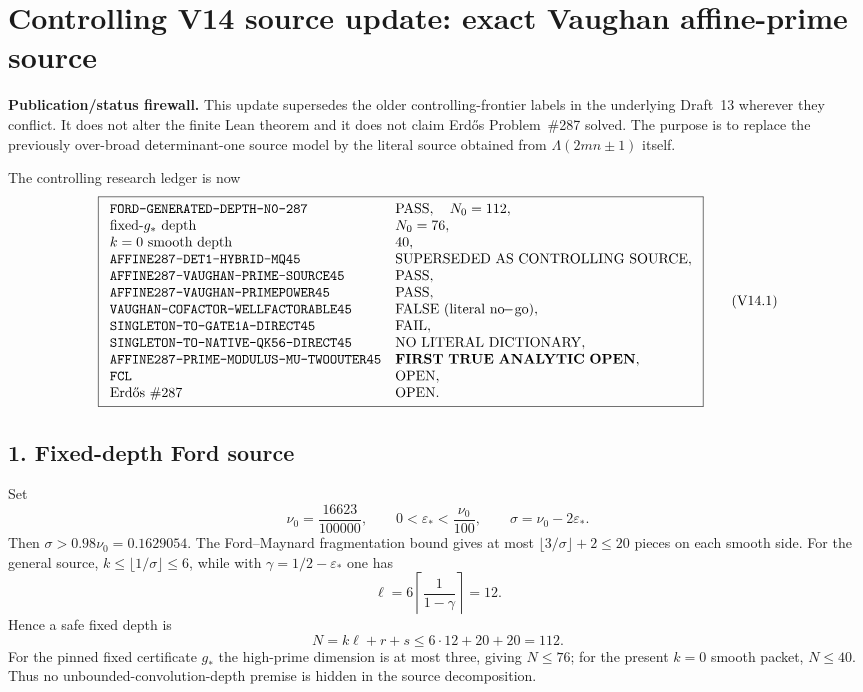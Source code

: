 \clearpage
\section*{Controlling V14 source update: exact Vaughan affine-prime source}

\noindent\textbf{Publication/status firewall.}
This update supersedes the older controlling-frontier labels in the underlying Draft~13 wherever they conflict.
It does not alter the finite Lean theorem and it does not claim Erd\H{o}s Problem~\#287 solved.  The purpose is to
replace the previously over-broad determinant-one source model by the literal source obtained from
$\Lambda(2mn\pm1)$ itself.

\medskip
\noindent The controlling research ledger is now
\[
\boxed{\begin{array}{ll}
\texttt{FORD-GENERATED-DEPTH-N0-287} & \mathrm{PASS},\quad N_0=112,\\
\text{fixed-}g_*\text{ depth} & N_0=76,\\
\text{$k=0$ smooth depth} & 40,\\
\texttt{AFFINE287-DET1-HYBRID-MQ45} & \mathrm{SUPERSEDED\ AS\ CONTROLLING\ SOURCE},\\
\texttt{AFFINE287-VAUGHAN-PRIME-SOURCE45} & \mathrm{PASS},\\
\texttt{AFFINE287-VAUGHAN-PRIMEPOWER45} & \mathrm{PASS},\\
\texttt{VAUGHAN-COFACTOR-WELLFACTORABLE45} & \mathrm{FALSE\ (literal\ no\!\!-\!go)},\\
\texttt{SINGLETON-TO-GATE1A-DIRECT45} & \mathrm{FAIL},\\
\texttt{SINGLETON-TO-NATIVE-QK56-DIRECT45} & \mathrm{NO\ LITERAL\ DICTIONARY},\\
\texttt{AFFINE287-PRIME-MODULUS-MU-TWOOUTER45} & \mathbf{FIRST\ TRUE\ ANALYTIC\ OPEN},\\
\texttt{FCL} & \mathrm{OPEN},\\
\text{Erd\H{o}s \#287} & \mathrm{OPEN}.
\end{array}}
\tag{V14.1}
\]

\subsection*{1. Fixed-depth Ford source}
Set
\[
\nu_0=\frac{16623}{100000},\qquad
0<\varepsilon_*<\frac{\nu_0}{100},\qquad
\sigma=\nu_0-2\varepsilon_*.
\]
Then $\sigma>0.98\nu_0=0.1629054$.  The Ford--Maynard fragmentation bound gives at most
$\lfloor 3/\sigma\rfloor+2\le20$ pieces on each smooth side.  For the general source,
$k\le\lfloor1/\sigma\rfloor\le6$, while with
$\gamma=1/2-\varepsilon_*$ one has
\[
\ell=6\left\lceil\frac1{1-\gamma}\right\rceil=12.
\]
Hence a safe fixed depth is
\[
\boxed{N=k\ell+r+s\le6\cdot12+20+20=112.}
\tag{V14.2}
\]
For the pinned fixed certificate $g_*$ the high-prime dimension is at most three, giving $N\le76$;
for the present $k=0$ smooth packet, $N\le40$.  Thus no unbounded-convolution-depth premise is hidden in the
source decomposition.


